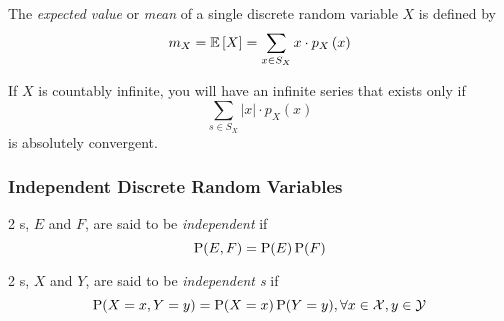 \begin{definition}\label{def:Expected_Value_of_Single_Discrete}
  The \emph{expected value} or \emph{mean} of a single discrete random variable $X$ is defined by
  \begin{equation}\label{eq:Expected_Value_of_Single_Discrete}
    m_{X} = \operatorname{\operatorname{\mathbb{E}}} \left[ X \right] = \sum_{x \in S_{X}} x \cdot p_{X} \left( x \right)
  \end{equation}
  \begin{remark}\label{rmk:Expected_Value_of_Single_Discrete_Countably_Infinite}
    If $X$ is countably infinite, you will have an infinite series that exists only if
    \begin{equation}\label{eq:Expected_Value_of_Single_Discrete_Countably_Infinite}
      \sum_{s \in S_{X}} \lvert x \rvert \cdot p_{X} \left( x \right)
    \end{equation}
    is absolutely convergent.
  \end{remark}
\end{definition}

\subsubsection{Independent Discrete Random Variables}\label{subsubsec:Independent_Discrete_Random_Variables}
\begin{definition}[Independent]\label{def:Independent}
  2 s, $E$ and $F$, are said to be \emph{independent} if
  \begin{equation}\label{eq:Independent}
    \operatorname{\operatorname{P}}(E,F) = \operatorname{\operatorname{P}}(E) \operatorname{\operatorname{P}}(F)
  \end{equation}

  2 s, $X$ and $Y$, are said to be \emph{independent s} if
  \begin{equation}\label{eq:Independent_Random_Variables}
    \operatorname{\operatorname{P}}(X=x, Y=y) = \operatorname{\operatorname{P}}(X=x) \operatorname{\operatorname{P}}(Y=y), \forall x \in \mathcal{X}, y \in \mathcal{Y}
  \end{equation}
\end{definition}

